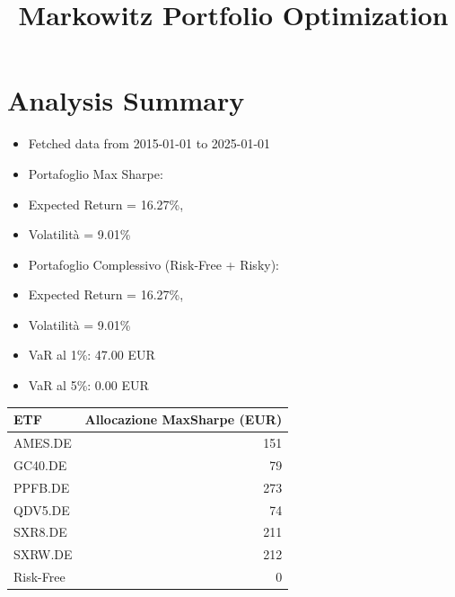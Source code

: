\documentclass{article}%
\title{Markowitz Portfolio Optimization}%
\author{}%
\date{}%
\begin{document}
%
\normalsize%
\maketitle%
\section*{Analysis Summary}%
\label{sec:AnalysisSummary}%
\begin{itemize}%
\item Fetched data from 2015-01-01 to 2025-01-01%
\item Portafoglio Max Sharpe: %
\item Expected Return = 16.27\%, %
\item Volatilità = 9.01\%%
\item Portafoglio Complessivo (Risk-Free + Risky):%
\item Expected Return = 16.27\%, %
\item Volatilità = 9.01\%%
\item VaR al 1\%: 47.00 EUR%
\item VaR al 5\%: 0.00 EUR%
\end{itemize}

%
\begin{tabular}{l r}%
\hline%
ETF&Allocazione MaxSharpe (EUR)\\%
\hline%
AMES.DE&151\\%
GC40.DE&79\\%
PPFB.DE&273\\%
QDV5.DE&74\\%
SXR8.DE&211\\%
SXRW.DE&212\\%
Risk{-}Free&0\\%
\hline%
\end{tabular}%
\end{document}
